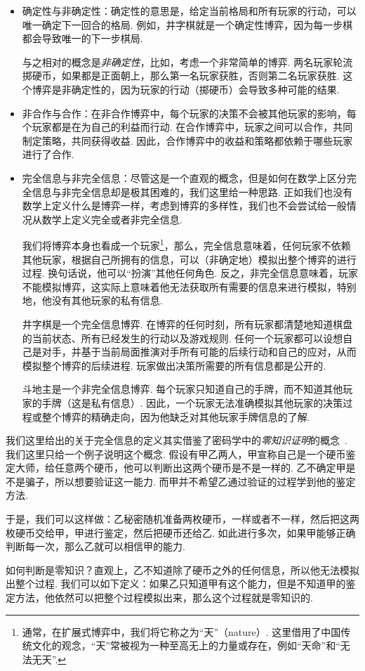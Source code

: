 \begin{itemize}
    \item 确定性与非确定性：确定性的意思是，给定当前格局和所有玩家的行动，可以唯一确定下一回合的格局. 例如，井字棋就是一个确定性博弈，因为每一步棋都会导致唯一的下一步棋局.
    
    与之相对的概念是\textit{非确定性}，比如，考虑一个非常简单的博弈. 两名玩家轮流掷硬币，如果都是正面朝上，那么第一名玩家获胜，否则第二名玩家获胜. 这个博弈是非确定性的，因为玩家的行动（掷硬币）会导致多种可能的结果.

    \item 非合作与合作：在非合作博弈中，每个玩家的决策不会被其他玩家的影响，每个玩家都是在为自己的利益而行动. 在合作博弈中，玩家之间可以合作，共同制定策略，共同获得收益. 因此，合作博弈中的收益和策略都依赖于哪些玩家进行了合作. 

    \item 完全信息与非完全信息：尽管这是一个直观的概念，但是如何在数学上区分完全信息与非完全信息却是极其困难的，我们这里给一种思路. 正如我们也没有数学上定义什么是博弈一样，考虑到博弈的多样性，我们也不会尝试给一般情况从数学上定义完全或者非完全信息. 
    
    我们将博弈本身也看成一个玩家\footnote{通常，在扩展式博弈中，我们将它称之为“天”（nature）. 这里借用了中国传统文化的观念，“天”常被视为一种至高无上的力量或存在，例如“天命”和“无法无天”. }，那么，完全信息意味着，任何玩家不依赖其他玩家，根据自己所拥有的信息，可以（非确定地）模拟出整个博弈的进行过程. 换句话说，他可以“扮演”其他任何角色. 反之，非完全信息意味着，玩家不能模拟博弈，这实际上意味着他无法获取所有需要的信息来进行模拟，特别地，他没有其他玩家的私有信息.

    井字棋是一个完全信息博弈. 在博弈的任何时刻，所有玩家都清楚地知道棋盘的当前状态、所有已经发生的行动以及游戏规则. 任何一个玩家都可以设想自己是对手，并基于当前局面推演对手所有可能的后续行动和自己的应对，从而模拟整个博弈的后续进程. 玩家做出决策所需要的所有信息都是公开的.

    斗地主是一个非完全信息博弈. 每个玩家只知道自己的手牌，而不知道其他玩家的手牌（这是私有信息）. 因此，一个玩家无法准确模拟其他玩家的决策过程或整个博弈的精确走向，因为他缺乏对其他玩家手牌信息的了解.

\end{itemize}

\begin{remark}
    我们这里给出的关于完全信息的定义其实借鉴了密码学中的\textit{零知识证明}的概念~\cite{goldwasserKnowledgeComplexityInteractive1985}. 我们这里只给一个例子说明这个概念. 假设有甲乙两人，甲宣称自己是一个硬币鉴定大师，给任意两个硬币，他可以判断出这两个硬币是不是一样的. 乙不确定甲是不是骗子，所以想要验证这一能力. 而甲并不希望乙通过验证的过程学到他的鉴定方法. 
    
    于是，我们可以这样做：乙秘密随机准备两枚硬币，一样或者不一样，然后把这两枚硬币交给甲，甲进行鉴定，然后把硬币还给乙. 如此进行多次，如果甲能够正确判断每一次，那么乙就可以相信甲的能力. 

    如何判断是零知识？直观上，乙不知道除了硬币之外的任何信息，所以他无法模拟出整个过程. 我们可以如下定义：如果乙只知道甲有这个能力，但是不知道甲的鉴定方法，他依然可以把整个过程模拟出来，那么这个过程就是零知识的. 
\end{remark}

